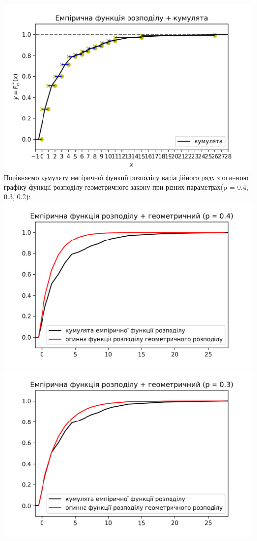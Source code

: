 \documentclass{article}
\begin{document}
\newline
\includegraphics[scale = 0.8]{func+kum}
\newpage
Порівняємо кумуляту емпіричної функції розподілу варіаційного ряду 
з огинною графіку функції розподілу геометричного закону при 
різних параметрах(p = 0.4, 0.3, 0.2):
\newline
\includegraphics[scale = 0.8]{func+geom2}
\newline
\includegraphics[scale = 0.8]{func+geom3}
\end{document}
